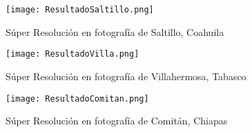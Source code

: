 \begin{figure}[H]
    \texttt{[image:  ResultadoSaltillo.png]}
    \centering
    \caption{Súper Resolución en fotografía de Saltillo, Coahuila}
    \label{fig:saltillo}
\end{figure}


\begin{figure}[H]
    \texttt{[image:  ResultadoVilla.png]}
    \centering
    \caption{Súper Resolución en fotografía de Villahermosa, Tabasco}
    \label{fig:villahermosa}
\end{figure}


\begin{figure}[H]
    \texttt{[image:  ResultadoComitan.png]}
    \centering
    \caption{Súper Resolución en fotografía de Comitán, Chiapas}
    \label{fig:comitan}
\end{figure}